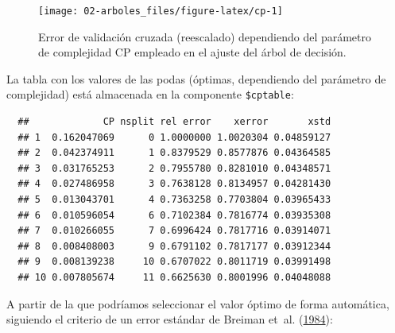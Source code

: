 \documentclass[
]{book}
\newenvironment{Shaded}{\begin{snugshade}}{\end{snugshade}}
\newcommand{\CommentTok}[1]{\textcolor[rgb]{0.56,0.35,0.01}{\textit{#1}}}
\newcommand{\DecValTok}[1]{\textcolor[rgb]{0.00,0.00,0.81}{#1}}
\newcommand{\FunctionTok}[1]{\textcolor[rgb]{0.00,0.00,0.00}{#1}}
\newcommand{\NormalTok}[1]{#1}
\newcommand{\OtherTok}[1]{\textcolor[rgb]{0.56,0.35,0.01}{#1}}
\newcommand{\SpecialCharTok}[1]{\textcolor[rgb]{0.00,0.00,0.00}{#1}}
\newcommand{\StringTok}[1]{\textcolor[rgb]{0.31,0.60,0.02}{#1}}
\theoremstyle{break}
\theoremstyle{nonumberplain}
\renewcommand{\CommentTok}[1]{\textcolor[rgb]{0.41,0.41,0.41}{\texttt{#1}}}
\begin{document}
\begin{figure}[!htb]

{\centering \texttt{[image: 02-arboles\_files/figure-latex/cp-1]} 

}

\caption{Error de validación cruzada (reescalado) dependiendo del parámetro de complejidad CP empleado en el ajuste del árbol de decisión.}\label{fig:cp}
\end{figure}

La tabla con los valores de las podas (óptimas, dependiendo del parámetro de complejidad)
está almacenada en la componente \texttt{\$cptable}:

\begin{Shaded}
\end{Shaded}

\begin{verbatim}
  ##             CP nsplit rel error    xerror       xstd
  ## 1  0.162047069      0 1.0000000 1.0020304 0.04859127
  ## 2  0.042374911      1 0.8379529 0.8577876 0.04364585
  ## 3  0.031765253      2 0.7955780 0.8281010 0.04348571
  ## 4  0.027486958      3 0.7638128 0.8134957 0.04281430
  ## 5  0.013043701      4 0.7363258 0.7703804 0.03965433
  ## 6  0.010596054      6 0.7102384 0.7816774 0.03935308
  ## 7  0.010266055      7 0.6996424 0.7817716 0.03914071
  ## 8  0.008408003      9 0.6791102 0.7817177 0.03912344
  ## 9  0.008139238     10 0.6707022 0.8011719 0.03991498
  ## 10 0.007805674     11 0.6625630 0.8001996 0.04048088
\end{verbatim}

A partir de la que podríamos seleccionar el valor óptimo de forma automática,
siguiendo el criterio de un error estándar de Breiman et~al. (\protect\hyperlink{ref-breiman1984classification}{1984}):

\begin{Shaded}
\end{Shaded}
\end{document}
